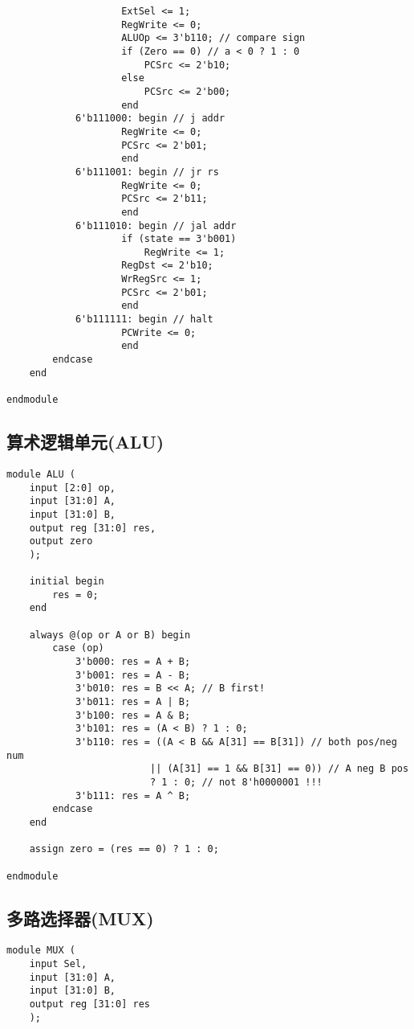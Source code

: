 \begin{multicols}{2}
\begin{lstlisting}
					ExtSel <= 1;
    				RegWrite <= 0;
    				ALUOp <= 3'b110; // compare sign
                    if (Zero == 0) // a < 0 ? 1 : 0
                        PCSrc <= 2'b10;
                    else
                        PCSrc <= 2'b00;
					end
			6'b111000: begin // j addr
    				RegWrite <= 0;
    				PCSrc <= 2'b01;
					end
            6'b111001: begin // jr rs
                    RegWrite <= 0;
                    PCSrc <= 2'b11;
                    end
            6'b111010: begin // jal addr
                    if (state == 3'b001)
                        RegWrite <= 1;
                    RegDst <= 2'b10;
                    WrRegSrc <= 1;
                    PCSrc <= 2'b01;
                    end
			6'b111111: begin // halt
					PCWrite <= 0;
					end
		endcase
	end
    
endmodule
\end{lstlisting}

\subsection{算术逻辑单元(ALU)}
\begin{lstlisting}
module ALU (
    input [2:0] op,
    input [31:0] A,
    input [31:0] B,
    output reg [31:0] res,
    output zero
    );
    
    initial begin
        res = 0;
    end
    
    always @(op or A or B) begin
        case (op)
            3'b000: res = A + B;
            3'b001: res = A - B;
            3'b010: res = B << A; // B first!
            3'b011: res = A | B;
            3'b100: res = A & B;
            3'b101: res = (A < B) ? 1 : 0;
            3'b110: res = ((A < B && A[31] == B[31]) // both pos/neg num
                         || (A[31] == 1 && B[31] == 0)) // A neg B pos
                         ? 1 : 0; // not 8'h0000001 !!!
            3'b111: res = A ^ B;
        endcase
    end

    assign zero = (res == 0) ? 1 : 0;

endmodule
\end{lstlisting}

\subsection{多路选择器(MUX)}
\begin{lstlisting}
module MUX (
    input Sel,
    input [31:0] A,
    input [31:0] B,
    output reg [31:0] res
    );
    

\end{lstlisting}
\end{multicols}
